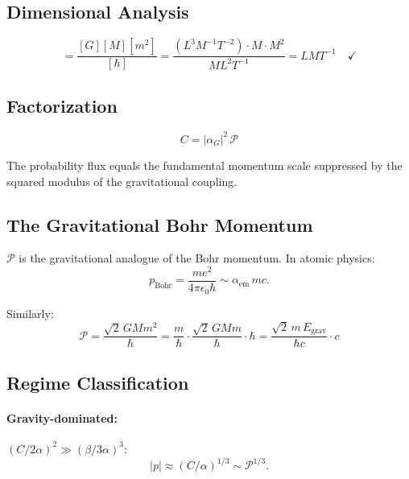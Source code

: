 \documentclass[11pt,a4paper]{article}
\theoremstyle{definition}
\theoremstyle{remark}
\begin{document}
	\subsection{Dimensional Analysis}
	
	\begin{equation}
		[\mathcal{P}] = \frac{[G][M][m^2]}{[\hbar]} = \frac{(L^3M^{-1}T^{-2})\cdot M\cdot M^2}{ML^2T^{-1}} = LMT^{-1} \quad\checkmark
	\end{equation}
	
	\subsection{Factorization}
	
	\begin{equation}
		\boxed{C = |\alpha_G|^2\,\mathcal{P}}
		\label{eq:C_factorization}
	\end{equation}
	
	The probability flux equals the fundamental momentum scale suppressed by the squared modulus of the gravitational coupling.
	
	\subsection{The Gravitational Bohr Momentum}
	
	$\mathcal{P}$ is the gravitational analogue of the Bohr momentum.  In atomic physics:
	\begin{equation}
		p_{\mathrm{Bohr}} = \frac{me^2}{4\pi\epsilon_0\hbar} \sim \alpha_{\mathrm{em}}\,mc.
	\end{equation}
	
	Similarly:
	\begin{equation}
		\mathcal{P} = \frac{\sqrt{2}\,GMm^2}{\hbar} = \frac{m}{\hbar}\cdot\frac{\sqrt{2}\,GMm}{\hbar} \cdot \hbar
		= \frac{\sqrt{2}\,m\,E_{\mathrm{grav}}}{\hbar c}\cdot c
	\end{equation}
	
	\subsection{Regime Classification}
	
	\paragraph{Gravity-dominated:} $(C/2\alpha)^2\gg(\beta/3\alpha)^3$:
	\begin{equation}
		|p| \approx (C/\alpha)^{1/3} \sim \mathcal{P}^{1/3}.
	\end{equation}
	
\end{document}
